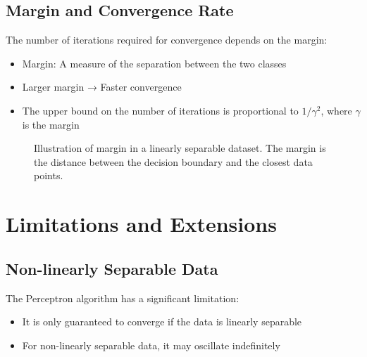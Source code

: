 \documentclass{article}
\begin{document}
\subsection{Margin and Convergence Rate}
The number of iterations required for convergence depends on the margin:
\begin{itemize}
    \item Margin: A measure of the separation between the two classes
    \item Larger margin → Faster convergence
    \item The upper bound on the number of iterations is proportional to $1/\gamma^2$, where $\gamma$ is the margin
\end{itemize}

\begin{figure}[h]
\centering
{}
\caption{Illustration of margin in a linearly separable dataset. The margin is the distance between the decision boundary and the closest data points.}
\end{figure}

\section{Limitations and Extensions}

\subsection{Non-linearly Separable Data}
The Perceptron algorithm has a significant limitation:
\begin{itemize}
    \item It is only guaranteed to converge if the data is linearly separable
    \item For non-linearly separable data, it may oscillate indefinitely
\end{itemize}
\end{document}
